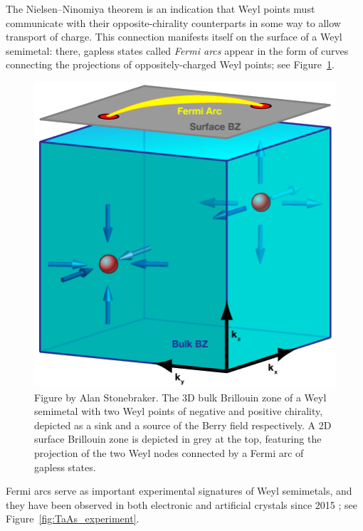 The Nielsen--Ninomiya theorem is an indication that Weyl points must communicate with their opposite-chirality counterparts in some way to allow transport of charge. This connection manifests itself on the surface of a Weyl semimetal: there, gapless states called \emph{Fermi arcs} appear in the form of curves connecting the projections of oppositely-charged Weyl points; see Figure~\ref{fig:WSM_bulk+arc}.
\begin{figure}[htb!]
	\centering
	\includegraphics[width=.5\linewidth]{Images/WSM_bulk+arc}
	\caption{Figure by Alan Stonebraker. %
		The 3D bulk Brillouin zone of a Weyl semimetal with two Weyl points of negative and positive chirality, depicted as a sink and a source of the Berry field respectively. A 2D surface Brillouin zone is depicted in grey at the top, featuring the projection of the two Weyl nodes connected by a Fermi arc of gapless states.}
	\label{fig:WSM_bulk+arc}
\end{figure}
Fermi arcs serve as important experimental signatures of Weyl semimetals, and they have been observed in both electronic and artificial crystals since 2015  \cite{Weng_WSM-candidates,Huang_WSM-candidates,Lv_WSM-TaAs,Xu_WSM-experiment,Belopolski_minimal-WSM,Liu_photonic-Chern-vector}; see Figure~\ref{fig:TaAs_experiment}.
